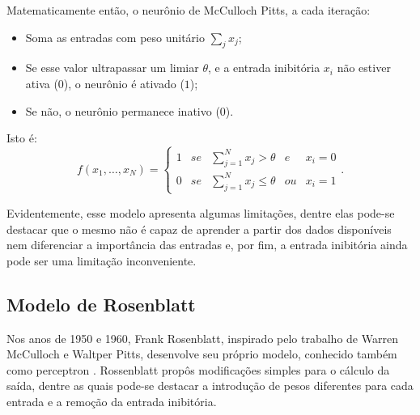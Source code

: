Matematicamente então, o neurônio de McCulloch Pitts, a cada iteração:
\begin{itemize}
\item Soma as entradas com peso unitário $\sum_{j}x_{j}$;
\item Se esse valor ultrapassar um limiar $\theta$, e a entrada inibitória $x_i$ não estiver ativa ($0$), o neurônio é ativado ($1$);
\item Se não, o neurônio permanece inativo ($0$).
\end{itemize}
Isto é:
\begin{equation}f\left(x_{1},\dots,x_{N}\right)=\left\{ \begin{array}{ccccc}
1 & se & \sum_{j=1}^{N}x_{j}>\theta & e & x_{i}=0\\
0 & se & \sum_{j=1}^{N}x_{j}\leq\theta & ou & x_{i}=1
\end{array}\right. . \end{equation}

Evidentemente, esse modelo apresenta algumas limitações, dentre elas pode-se destacar que o mesmo não é capaz de aprender a partir dos dados disponíveis nem diferenciar a importância das entradas e, por fim, a entrada inibitória ainda pode ser uma limitação inconveniente.

\subsection{Modelo de Rosenblatt}

Nos anos de 1950 e 1960, Frank Rosenblatt, inspirado pelo trabalho de Warren McCulloch e Waltper Pitts, desenvolve seu próprio modelo, conhecido também como perceptron \cite{nielsen2015neural}. Rossenblatt propôs modificações simples para o cálculo da saída, dentre as quais pode-se destacar a introdução de pesos diferentes para cada entrada e a remoção da entrada inibitória.

